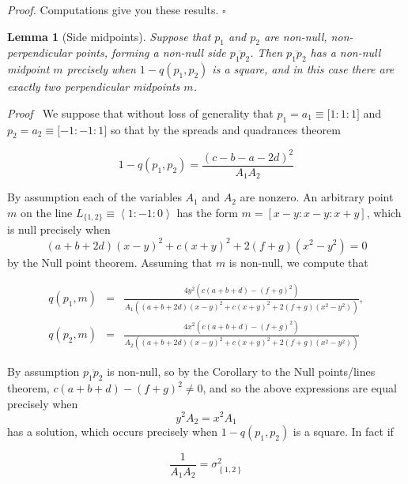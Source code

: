 \documentclass[11pt]{article}
\newtheorem{theorem}{Theorem}
\newtheorem{theorem}{Lemma}
\begin{document}
\textit{Proof. }Computations give you these results. $\square $

\begin{theorem}[Side midpoints]
Suppose that $p_{1}$ and $p_{2}$ are non-null, non-perpendicular points,
forming a non-null side $\overline{p_{1}p_{2}}$. Then $\overline{p_{1}p_{2}}$
has a non-null midpoint $m$ precisely when $1-q(p_{1},p_{2})$ is a square,
and in this case there are exactly two perpendicular midpoints $m$.
\end{theorem}

\textit{Proof \ }We suppose that without loss of generality that $%
p_{1}=a_{1}\equiv \lbrack 1:1:1]$ and $p_{2}=a_{2}\equiv \lbrack -1:-1:1]$
so that by the spreads and quadrances theorem

\begin{equation*}
1-q(p_{1},p_{2})=\frac{(c-b-a-2d)^{2}}{A_{1}A_{2}}
\end{equation*}

By assumption each of the variables $A_{1}$ and $A_{2}$ are nonzero. An
arbitrary point $m$ on the line $L_{\{1,2\}}\equiv \left\langle
1:-1:0\right\rangle $ has the form $m=[x-y:x-y:x+y]$, which is null
precisely when 
\begin{equation*}
(a+b+2d)(x-y)^{2}+c(x+y)^{2}+2\left( f+g\right) (x^{2}-y^{2})=0
\end{equation*}
by the Null point theorem. Assuming that $m$ is non-null, we compute that

\begin{eqnarray*}
q(p_{1},m) &=&\frac{4y^{2}\left( c\left( a+b+d\right) -\left( f+g\right)
^{2}\right) }{A_{1}\left( (a+b+2d)(x-y)^{2}+c(x+y)^{2}+2\left( f+g\right)
(x^{2}-y^{2})\right) }, \\
q(p_{2},m) &=&\frac{4x^{2}\left( c\left( a+b+d\right) -\left( f+g\right)
^{2}\right) }{A_{2}\left( (a+b+2d)(x-y)^{2}+c(x+y)^{2}+2\left( f+g\right)
(x^{2}-y^{2})\right) }
\end{eqnarray*}%
\linebreak

By assumption $\overline{p_{1}p_{2}}$ is non-null, so by the Corollary to
the Null points/lines theorem, $c\left( a+b+d\right) -\left( f+g\right)
^{2}\neq 0$, and so the above expressions are equal precisely when 
\begin{equation*}
y^{2}A_{2}=x^{2}A_{1}
\end{equation*}
has a solution, which occurs precisely when $1-q(p_{1},p_{2})$ is a square.
In fact if

\begin{equation*}
\frac{1}{A_{1}A_{2}}=\sigma _{\left\{ 1,2\right\} }^{2}
\end{equation*}
\end{document}
